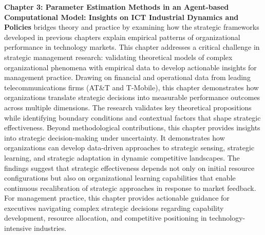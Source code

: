 \documentclass[11pt]{article}
\begin{document}
\textbf{Chapter 3: Parameter Estimation Methods in an Agent-based Computational Model: Insights on ICT Industrial Dynamics and Policies} bridges theory and practice by examining how the strategic frameworks developed in previous chapters explain empirical patterns of organizational performance in technology markets. This chapter addresses a critical challenge in strategic management research: validating theoretical models of complex organizational phenomena with empirical data to develop actionable insights for management practice.
Drawing on financial and operational data from leading telecommunications firms (AT\&T and T-Mobile), this chapter demonstrates how organizations translate strategic decisions into measurable performance outcomes across multiple dimensions. The research validates key theoretical propositions while identifying boundary conditions and contextual factors that shape strategic effectiveness.
Beyond methodological contributions, this chapter provides insights into strategic decision-making under uncertainty. It demonstrates how organizations can develop data-driven approaches to strategic sensing, strategic learning, and strategic adaptation in dynamic competitive landscapes. 
The findings suggest that strategic effectiveness depends not only on initial resource configurations but also on organizational learning capabilities that enable continuous recalibration of strategic approaches in response to market feedback.
For management practice, this chapter provides actionable guidance for executives navigating complex strategic decisions regarding capability development, resource allocation, and competitive positioning in technology-intensive industries.




\newpage
\printbibliography
\end{document}
